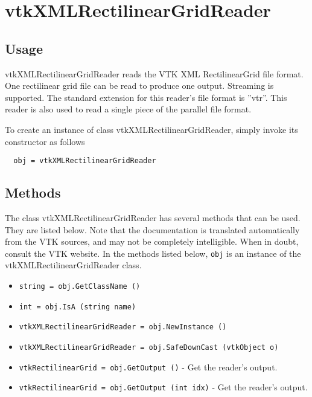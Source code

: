 \section{vtkXMLRectilinearGridReader}

\subsection{Usage}

 vtkXMLRectilinearGridReader reads the VTK XML RectilinearGrid file
 format.  One rectilinear grid file can be read to produce one
 output.  Streaming is supported.  The standard extension for this
 reader's file format is ''vtr''.  This reader is also used to read a
 single piece of the parallel file format.

To create an instance of class vtkXMLRectilinearGridReader, simply
invoke its constructor as follows
\begin{verbatim}
  obj = vtkXMLRectilinearGridReader
\end{verbatim}
\subsection{Methods}

The class vtkXMLRectilinearGridReader has several methods that can be used.
  They are listed below.
Note that the documentation is translated automatically from the VTK sources,
and may not be completely intelligible.  When in doubt, consult the VTK website.
In the methods listed below, \verb|obj| is an instance of the vtkXMLRectilinearGridReader class.
\begin{itemize}
\item  \verb|string = obj.GetClassName ()|

\item  \verb|int = obj.IsA (string name)|

\item  \verb|vtkXMLRectilinearGridReader = obj.NewInstance ()|

\item  \verb|vtkXMLRectilinearGridReader = obj.SafeDownCast (vtkObject o)|

\item  \verb|vtkRectilinearGrid = obj.GetOutput ()| -  Get the reader's output.

\item  \verb|vtkRectilinearGrid = obj.GetOutput (int idx)| -  Get the reader's output.

\end{itemize}
